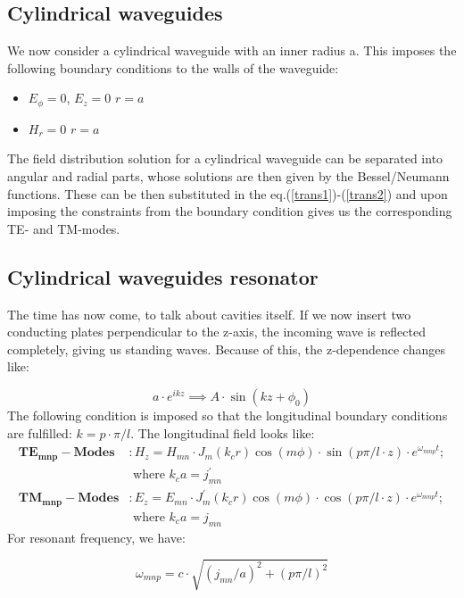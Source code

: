 \documentclass[a4paper]{article}
\numberwithin{equation}{section}
\begin{document}
\subsection{Cylindrical waveguides}
We now consider a cylindrical waveguide with an inner radius a. This imposes the
following boundary conditions to the walls of the waveguide:
\begin{itemize}
		\item $E_{\phi} = 0$, $E_{z} = 0 $  $r = a$ 
		\item $H_{r} = 0 $  $r = a$ 
\end{itemize}

The field distribution solution for a cylindrical waveguide can be separated
into angular and radial parts, whose solutions are then given by the
Bessel/Neumann functions. These can be then substituted in the
eq.(\ref{trans1})-(\ref{trans2}) and upon imposing the constraints from the
boundary condition gives us the corresponding TE- and TM-modes.

\subsection{Cylindrical waveguides resonator}
The time has now come, to talk about cavities itself. If we now insert two
conducting plates perpendicular to the z-axis, the incoming wave is reflected
completely, giving us standing waves. Because of this, the z-dependence changes
like: 

\[
		a \cdot e^{ikz} \implies A \cdot \sin\left(kz + \phi_{0}\right)    
\]
The following condition is imposed so that the longitudinal boundary conditions
are fulfilled: $k = p\cdot \pi /l $. The longitudinal field looks like: 
\begin{align*}
		\mathbf{TE_{mnp}-Modes}&: H_{z} = H_{mn}\cdot J_{m} \left(k_{c}r \right) \cos\left(m \phi \right) \cdot \sin\left(p \pi / l \cdot z \right) \cdot e^{\omega_{mnp}t}; \\  &\text{ where } k_{c}a=j_{mn}^{'}  \\
		\mathbf{TM_{mnp}-Modes}&: E_{z} = E_{mn}\cdot J_{m}^{'}  \left(k_{c}r \right) \cos\left(m \phi \right) \cdot \cos\left(p \pi / l \cdot z \right) \cdot e^{\omega_{mnp}t}; \\  &\text{ where } k_{c}a=j_{mn} 
\end{align*}
For resonant frequency, we have:

\[
		\omega_{mnp} = c \cdot \sqrt{\left(j_{mn}/a\right)^2 + \left(p \pi / l\right)^2} 
\]
\end{document}
